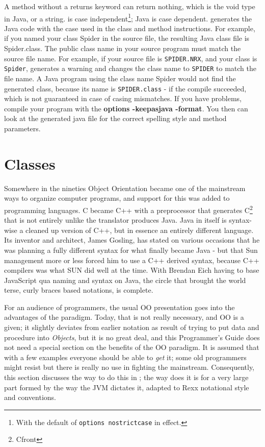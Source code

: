 A \nr{} method without a returns keyword can return nothing, which is the void type in Java, or a \Rexx{} string. 
\nr{}is case independent\footnote{With the default of \texttt{options
  nostrictcase} in effect.}; Java is case dependent. \nr{} generates
the Java code with the case used in the class and method
instructions. For example, if you named your class Spider in the \nr{}
source file, the resulting Java class file is Spider.class.
The public class name in your source program must match the \nr{}
source file name. For example, if your source file is \texttt{SPIDER.NRX}, and
your class is \texttt{Spider}, \nr{} generates a warning and changes the
class name to \texttt{SPIDER} to match the file name. A Java program using the
class name Spider would not find the generated class, because its name
is \texttt{SPIDER.class} - if the compile succeeded, which is not guaranteed in
case of casing mismatches.
If you have problems, compile your \nr{} program with the \textbf{options
-keepasjava -format}. You then can look at the generated java file for the correct spelling style and method parameters.

\chapter{Classes}\label{classes}
Somewhere in the nineties Object Orientation became one of the
mainstream ways to organize computer programs, and support for this
was added to programming languages. C became C++ with a preprocessor
that generates C\footnote{Cfront} that is not entirely unlike the
  \nr{} translator produces Java. Java in itself is syntax-wise a
  cleaned up version of C++, but in essence an entirely different
  language. Its inventor and architect, James Gosling, has stated on
  various occasions that he was planning a fully different syntax for
  what finally became Java - but that Sun management more or less
  forced him to use a C++ derived syntax, because C++ compilers was
  what SUN did well at the time. With Brendan Eich having to base
  JavaScript qua naming and syntax on Java, the circle that brought
  the world terse, curly braces based notations, is complete.

For an audience of \Rexx{} programmers, the usual OO presentation goes
into the advantages of the paradigm. Today, that is not really
necessary, and OO is a given; it slightly deviates from earlier
notation as result of trying to put data and procedure into
\emph{Objects}, but it is no great deal, and this \nr{} Programmer's
Guide does not need a special section on the benefits of the OO
paradigm. It is assumed that with a few examples everyone should be
able to \emph{get} it; some old programmers might resist but there is
really no use in fighting the mainstream. Consequently, this section
discusses the way to do this in \nr{}; the way \nr{} does it is for a very
large part formed by the way the JVM dictates it, adapted to Rexx
notational style and conventions.

